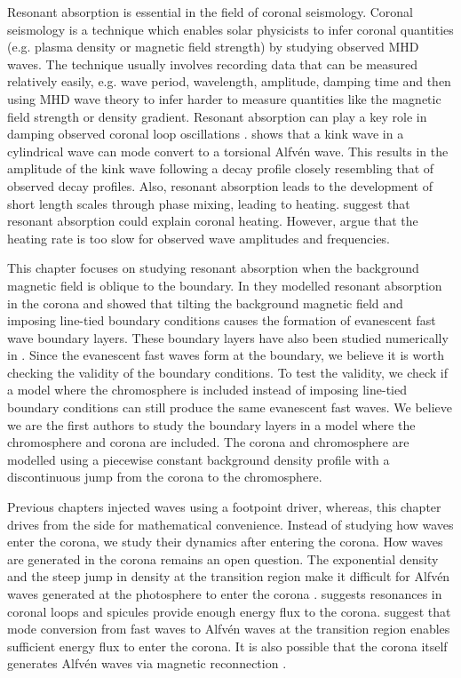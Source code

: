 Resonant absorption is essential in the field of coronal seismology. Coronal seismology is a technique which enables solar physicists to infer coronal quantities (e.g. plasma density or magnetic field strength) by studying observed MHD waves. The technique usually involves recording data that can be measured relatively easily, e.g. wave period, wavelength, amplitude, damping time and then using MHD wave theory to infer harder to measure quantities like the magnetic field strength or density gradient. Resonant absorption can play a key role in damping observed coronal loop oscillations \citep{Nakariakov1999, Terradas2006}. \citet{Ruderman2002} shows that a kink wave in a cylindrical wave can mode convert to a torsional Alfv\'en wave. This results in the amplitude of the kink wave following a decay profile closely resembling that of observed decay profiles. Also, resonant absorption leads to the development of short length scales through phase mixing, leading to heating. \citet{Poedts1989,Ofman1995} suggest that resonant absorption could explain coronal heating. However, \citet{Prokopyszyn2019b} argue that the heating rate is too slow for observed wave amplitudes and frequencies.

This chapter focuses on studying resonant absorption when the background magnetic field is oblique to the boundary. In \citet{Halberstadt1993,Halberstadt1995} they modelled resonant absorption in the corona and showed that tilting the background magnetic field and imposing line-tied boundary conditions causes the formation of evanescent fast wave boundary layers. These boundary layers have also been studied numerically in \citet{Arregui2003}. Since the evanescent fast waves form at the boundary, we believe it is worth checking the validity of the boundary conditions. To test the validity, we check if a model where the chromosphere is included instead of imposing line-tied boundary conditions can still produce the same evanescent fast waves. We believe we are the first authors to study the boundary layers in a model where the chromosphere and corona are included. The corona and chromosphere are modelled using a piecewise constant background density profile with a discontinuous jump from the corona to the chromosphere.

Previous chapters injected waves using a footpoint driver, whereas, this chapter drives from the side for mathematical convenience. Instead of studying how waves enter the corona, we study their dynamics after entering the corona. How waves are generated in the corona remains an open question. The exponential density and the steep jump in density at the transition region make it difficult for Alfv\'en waves generated at the photosphere to enter the corona \citep{Cranmer2005}. \citet{Hollweg1984b} suggests resonances in coronal loops and spicules provide enough energy flux to the corona. \citet{Cally2011,Hansen2012} suggest that mode conversion from fast waves to Alfv\'en waves at the transition region enables sufficient energy flux to enter the corona. It is also possible that the corona itself generates Alfv\'en waves via magnetic reconnection \citep{Cranmer2018}.

